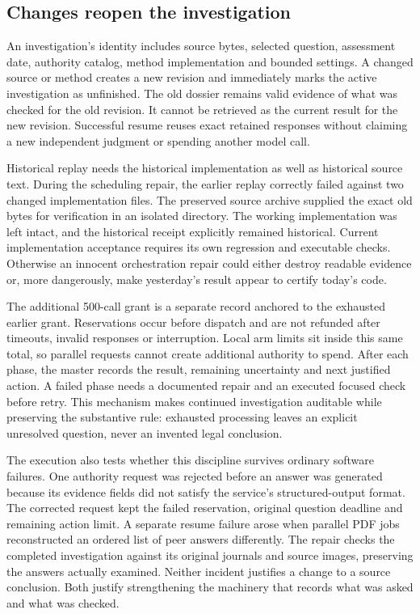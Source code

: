 \subsection{Changes reopen the investigation}

An investigation's identity includes source bytes, selected question, assessment
date, authority catalog, method implementation and bounded settings. A changed
source or method creates a new revision and immediately marks the active
investigation as unfinished. The old dossier remains valid evidence of what was
checked for the old revision. It cannot be retrieved as the current result for
the new revision. Successful resume reuses exact retained responses without
claiming a new independent judgment or spending another model call.

Historical replay needs the historical implementation as well as historical
source text. During the scheduling repair, the earlier replay correctly failed
against two changed implementation files. The preserved source archive supplied
the exact old bytes for verification in an isolated directory. The working
implementation was left intact, and the historical receipt explicitly remained
historical. Current implementation acceptance requires its own regression and
executable checks. Otherwise an innocent orchestration repair could either
destroy readable evidence or, more dangerously, make yesterday's result appear
to certify today's code.

The additional 500-call grant is a separate record anchored to the exhausted
earlier grant. Reservations occur before dispatch and are not refunded after
timeouts, invalid responses or interruption. Local arm limits sit inside this
same total, so parallel requests cannot create additional authority to spend.
After each phase, the master records the result, remaining uncertainty and next
justified action. A failed phase needs a documented repair and an executed
focused check before retry. This mechanism makes continued investigation
auditable while preserving the substantive rule: exhausted processing leaves
an explicit unresolved question, never an invented legal conclusion.

The execution also tests whether this discipline survives ordinary software
failures. One authority request was rejected before an answer was generated
because its evidence fields did not satisfy the service's structured-output
format. The corrected request kept the failed reservation, original question
deadline and remaining action limit. A separate resume failure arose when
parallel PDF jobs reconstructed an ordered list of peer answers differently.
The repair checks the completed investigation against its original journals
and source images, preserving the answers actually examined. Neither incident
justifies a change to a source conclusion. Both justify strengthening the
machinery that records what was asked and what was checked.

